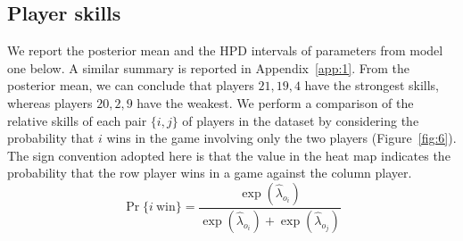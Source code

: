 \subsection{Player skills}
We report the posterior mean and the HPD intervals of parameters from model one below. A similar summary is reported in Appendix~\ref{app:1}. From the posterior mean, we can conclude that players $21, 19, 4$ have the strongest skills, whereas players $20, 2, 9$ have the weakest. We perform a comparison of the relative skills of each pair $\{i, j\}$ of players in the dataset by considering the probability that $i$ wins in the game involving only the two players (Figure~\ref{fig:6}). The sign convention adopted here is that the value in the heat map indicates the probability that the row player wins in a game against the column player.
\begin{equation*}
\operatorname{Pr}\{i~\text{win}\}= \frac{\exp (\hat{\lambda}_{o_{i}})}{\exp (\hat{\lambda}_{o_{i}}) + \exp (\hat{\lambda}_{o_{j}})}
\end{equation*}

